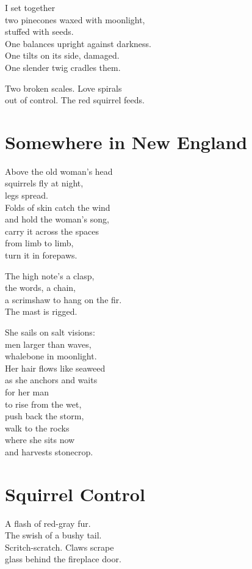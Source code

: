 \documentclass[twoside,10pt]{book}
\begin{document}
I set together\\
two pinecones waxed with moonlight,\\
stuffed with seeds.\\
One balances upright against darkness.\\
One tilts on its side, damaged.\\
One slender twig cradles them.

Two broken scales. Love spirals\\
out of control. The red squirrel feeds.


\clearpage
\section{Somewhere in New England}

Above the old woman's head\\
squirrels fly at night,\\
legs spread.\\
Folds of skin catch the wind\\
and hold the woman's song,\\
carry it across the spaces\\
from limb to limb,\\
turn it in forepaws.

The high note's a clasp,\\
the words, a chain,\\
a scrimshaw to hang on the fir.\\
The mast is rigged.

She sails on salt visions:\\
men larger than waves,\\
whalebone in moonlight.\\
Her hair flows like seaweed\\
as she anchors and waits\\
for her man\\
to rise from the wet,\\
push back the storm,\\
walk to the rocks\\
where she sits now\\
and harvests stonecrop.


\clearpage
\section{Squirrel Control}

A flash of red-gray fur.\\
The swish of a bushy tail.\\
Scritch-scratch. Claws scrape\\
glass behind the fireplace door.
\end{document}
